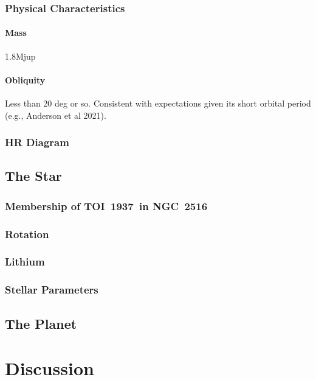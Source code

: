 \documentclass[12pt,twocolumn,tighten]{aastex63}
\newcommand{\tn}{TOI~1937} %
\newcommand{\cn}{NGC~2516} %
\begin{document}
\subsubsection{Physical Characteristics}
\label{subsec:clusterchar}

\paragraph{Mass} 1.8Mjup

\paragraph{Obliquity} Less than 20 deg or so. Consistent with
expectations given its short orbital period (e.g., Anderson et al
2021). 

\subsubsection{HR Diagram}
\label{subsec:hr}

\subsection{The Star}
\label{subsec:star}

\subsubsection{Membership of \tn\ in \cn}
\label{subsec:member}

\subsubsection{Rotation}

\subsubsection{Lithium}

\subsubsection{Stellar Parameters}
\label{subsec:starparams}

\subsection{The Planet}
\label{subsec:planet}


\section{Discussion}
\label{sec:discussion}
\end{document}
